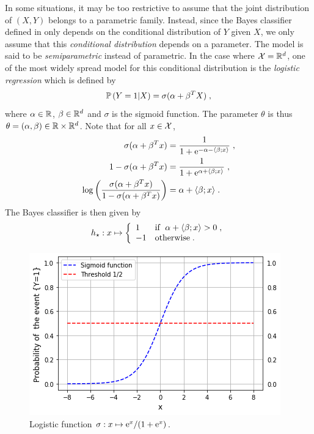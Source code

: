 In some situations, it may be too restrictive to assume that the joint distribution of $(X,Y)$ belongs to a parametric family. Instead, since the Bayes classifier defined in  only depends on the conditional distribution of $Y$ given $X$, we only assume that this {\em conditional distribution} depends on a parameter. The model is said to be  {\em semiparametric} instead of parametric. In the case where $\mathcal{X} = \mathbb{R}^d$, one of the most widely spread model for this conditional distribution is the {\em logistic regression} which is defined by
\begin{equation}
\label{eq:prob:logistic}
\mathbb{P}\left(Y=1\middle |X\right) = \sigma(\alpha + \beta^TX)\;,
\end{equation}
where $\alpha\in\mathbb{R}$, $\beta\in\mathbb{R}^d$ and $\sigma$ is the sigmoid function.
The parameter $\theta$ is thus $\theta=(\alpha,\beta) \in \mathbb{R} \times \mathbb{R}^d$.
Note that for all $x\in\mathcal{X}$,
\begin{align*}
\sigma(\alpha + \beta^Tx) &= \frac{1}{1+\mathrm{e}^{-\alpha - \langle \beta;x\rangle}}\;, \\
1- \sigma(\alpha + \beta^Tx) &= \frac{1}{1+\mathrm{e}^{\alpha + \langle \beta;x\rangle}}\;,\\
\log\left(\frac{\sigma(\alpha + \beta^Tx)}{1-\sigma(\alpha + \beta^Tx)}\right) &= \alpha + \langle \beta;x\rangle\;.
\end{align*}
The Bayes classifier is then given by
\[
h_{\star}: x\mapsto  \left\{
    \begin{array}{ll}
       1 & \mbox{if }\; \alpha + \langle \beta;x\rangle>0\;, \\
        -1 & \mbox{otherwise}\;.
    \end{array}
\right.
\]

\begin{figure}
\begin{center}
\includegraphics[width = .7\linewidth]{./Illustrations/logistic_function.png}
\end{center}
\caption{Logistic function $\sigma: x \mapsto \mathrm{e}^x/(1+\mathrm{e}^x)$.}
\end{figure}

